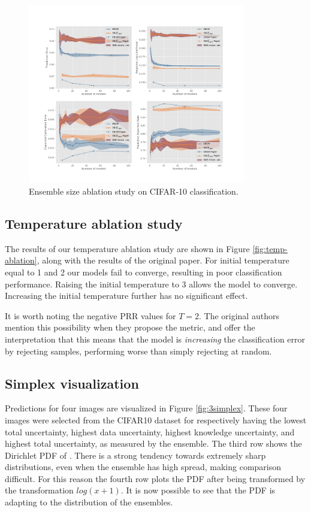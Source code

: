 \begin{figure}[h!]
    \centering
    \includegraphics[trim = 70 54 100 100, clip, width = 0.85\textwidth]{../openreview/plots/Figure_8.png}
    \caption{Ensemble size ablation study on CIFAR-10 classification.}
    \label{fig:size-ablation}
\end{figure}

\subsection{Temperature ablation study}

The results of our temperature ablation study are shown in Figure \ref{fig:temp-ablation}, along with the results of the original paper. For initial temperature equal to 1 and 2 our models fail to converge, resulting in poor classification performance. Raising the initial temperature to 3 allows the model to converge. Increasing the initial temperature further has no significant effect. 

It is worth noting the negative PRR values for $T=2$. The original authors mention this possibility when they propose the metric, and offer the interpretation that this means that the model is \textit{increasing} the classification error by rejecting samples, performing worse than simply rejecting at random. 

\subsection{Simplex visualization}
Predictions for four images are visualized in Figure \ref{fig:3simplex}. These four images were selected from the CIFAR10 dataset for respectively having the lowest total uncertainty, highest data uncertainty, highest knowledge uncertainty, and highest total uncertainty, as measured by the ensemble. The third row shows the Dirichlet PDF of \EnDD. There is a strong tendency towards extremely sharp distributions, even when the ensemble has high spread, making comparison difficult. For this reason the fourth row plots the PDF after being transformed by the transformation $log(x + 1)$. It is now possible to see that the PDF is adapting to the distribution of the ensembles.

